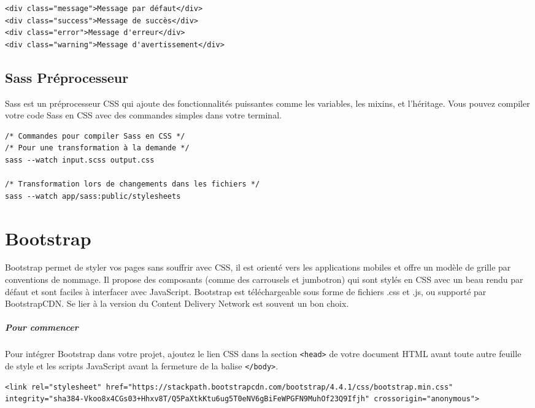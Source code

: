 \documentclass{report}
\begin{document}
\begin{multicols*}{2}
\begin{lstlisting}[style=HTMLDraculaDark]
<div class="message">Message par défaut</div>
<div class="success">Message de succès</div>
<div class="error">Message d'erreur</div>
<div class="warning">Message d'avertissement</div>
\end{lstlisting}

\section*{Sass Préprocesseur}

Sass est un préprocesseur CSS qui ajoute des fonctionnalités puissantes comme les variables, les mixins, et l'héritage. Vous pouvez compiler votre code Sass en CSS avec des commandes simples dans votre terminal.

\begin{lstlisting}[style=CSSDraculaLight]
/* Commandes pour compiler Sass en CSS */
/* Pour une transformation à la demande */
sass --watch input.scss output.css

/* Transformation lors de changements dans les fichiers */
sass --watch app/sass:public/stylesheets
\end{lstlisting}




\chapter{Bootstrap}
Bootstrap permet de styler vos pages sans souffrir avec CSS, il est orienté vers les applications mobiles et offre un modèle de grille par conventions de nommage. Il propose des composants (comme des carrousels et jumbotron) qui sont stylés en CSS avec un beau rendu par défaut et sont faciles à interfacer avec JavaScript. Bootstrap est téléchargeable sous forme de fichiers .css et .js, ou supporté par BootstrapCDN. Se lier à la version du Content Delivery Network est souvent un bon choix.





\paragraph{Pour commencer}
Pour intégrer Bootstrap dans votre projet, ajoutez le lien CSS dans la section \texttt{<head>} de votre document HTML avant toute autre feuille de style et les scripts JavaScript avant la fermeture de la balise \texttt{</body>}.

\begin{lstlisting}[style=CSSDraculaLight]
<link rel="stylesheet" href="https://stackpath.bootstrapcdn.com/bootstrap/4.4.1/css/bootstrap.min.css" integrity="sha384-Vkoo8x4CGs03+Hhxv8T/Q5PaXtkKtu6ug5T0eNV6gBiFeWPGFN9MuhOf23Q9Ifjh" crossorigin="anonymous">
\end{lstlisting}


\end{multicols*}
\end{document}
